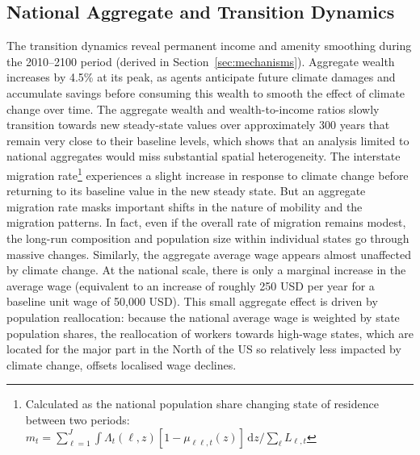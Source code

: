 \documentclass[11pt, a4paper]{article}
\begin{document}
\subsection{National Aggregate and Transition Dynamics}
The transition dynamics reveal permanent income and amenity smoothing during the 2010--2100 period (derived in Section~\ref{sec:mechanisms}). Aggregate wealth increases by 4.5\% at its peak, as agents anticipate future climate damages and accumulate savings before consuming this wealth to smooth the effect of climate change over time. The aggregate wealth and wealth-to-income ratios slowly transition towards new steady-state values over approximately 300 years that remain very close to their baseline levels, which shows that an analysis limited to national aggregates would miss substantial spatial heterogeneity. The interstate migration rate\footnote{Calculated as the national population share changing state of residence between two periods: $m_t = \sum_{\ell=1}^J \int \Lambda_t(\ell,z) [1 - \mu_{\ell \ell,t}(z)]\,\mathrm{d}z / \sum_\ell L_{\ell,t}$} experiences a slight increase in response to climate change before returning to its baseline value in the new steady state. But an aggregate migration rate masks important shifts in the nature of mobility and the migration patterns. In fact, even if the overall rate of migration remains modest, the long-run composition and population size within individual states go through massive changes. Similarly, the aggregate average wage appears almost unaffected by climate change. At the national scale, there is only a marginal increase in the average wage (equivalent to an increase of roughly 250 USD per year for a baseline unit wage of 50,000 USD). This small aggregate effect is driven by population reallocation: because the national average wage is weighted by state population shares, the reallocation of workers towards high-wage states, which are located for the major part in the North of the US so relatively less impacted by climate change, offsets localised wage declines.
\end{document}
